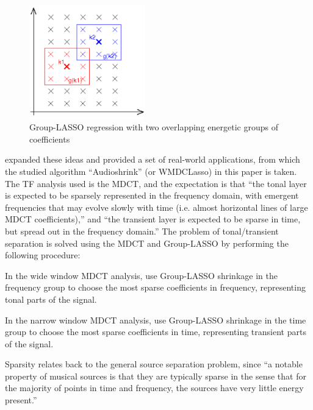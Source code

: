 \documentclass[letter,12pt]{article}
\newenvironment{tight_itemize}{
\begin{itemize}
  \setlength{\itemsep}{0pt}
  \setlength{\parskip}{0pt}
}{\end{itemize}}
\begin{document}
\begin{figure}
	\centering
	\includegraphics[width=5cm]{./grouplasso.png}
	\caption{Group-LASSO regression with two overlapping energetic groups of coefficients}
	\label{fig:grouplasso}
\end{figure}

\citet{wmdct} expanded these ideas and provided a set of real-world applications, from which the studied algorithm ``Audioshrink'' (or WMDCLasso) in this paper is taken. The TF analysis used is the MDCT, and the expectation is that ``the  tonal  layer  is  expected  to  be  sparsely  represented in the frequency domain, with emergent frequencies that may evolve slowly with time (i.e. almost horizontal lines of large MDCT coefficients),'' and ``the transient layer is expected to be sparse in time, but spread out in the frequency domain.'' The problem of tonal/transient separation is solved using the MDCT and Group-LASSO by performing the following procedure:

\begin{tight_itemize}
	\item
		In the wide window MDCT analysis, use Group-LASSO shrinkage in the frequency group to choose the most sparse coefficients in frequency, representing tonal parts of the signal.
	\item
		In the narrow window MDCT analysis, use Group-LASSO shrinkage in the time group to choose the most sparse coefficients in time, representing transient parts of the signal.
\end{tight_itemize}

Sparsity relates back to the general source separation problem, since ``a notable property of musical sources is that they are typically sparse in the sense that for the majority of points in time and frequency, the sources have very little energy present.''\cite{musicsepgood}
\end{document}

